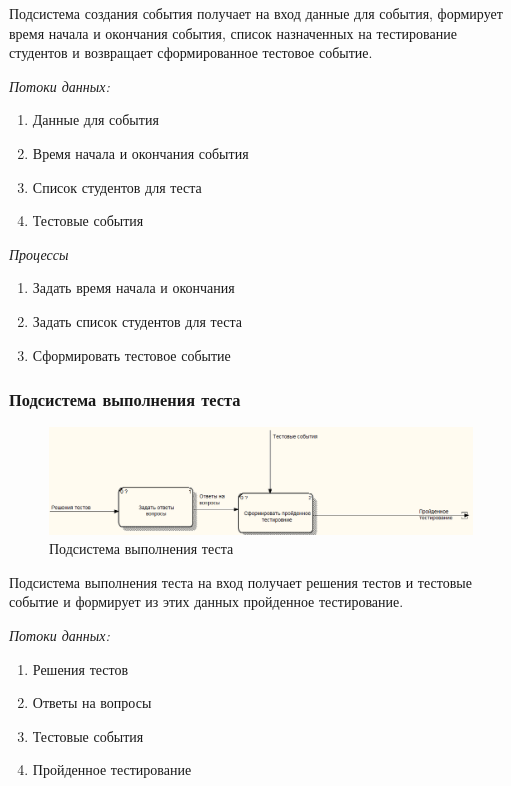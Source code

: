 Подсистема создания события получает на вход данные для события, формирует время
начала и окончания события, список назначенных на тестирование студентов и
возвращает сформированное тестовое событие.


\textit{Потоки данных:}
\begin{enumerate}
    \item Данные для события
    \item Время начала и окончания события
    \item Список студентов для теста
    \item Тестовые события
\end{enumerate}


\textit{Процессы}
\begin{enumerate}
    \item Задать время начала и окончания
    \item Задать список студентов для теста
    \item Сформировать тестовое событие
\end{enumerate}


\subsubsection{Подсистема выполнения теста}
\begin{figure}[H]
    \includegraphics[width=\textwidth, center]{../img/dfd/Subsystem_Runner.png}
    \caption{Подсистема выполнения теста}
\end{figure}

Подсистема выполнения теста на вход получает решения тестов и тестовые событие
и формирует из этих данных пройденное тестирование.

\textit{Потоки данных:}
\begin{enumerate}
    \item Решения тестов
    \item Ответы на вопросы
    \item Тестовые события
    \item Пройденное тестирование
\end{enumerate}

